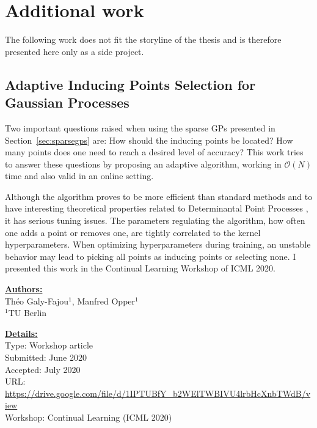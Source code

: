 \chapter{Additional work} 
\label{appendix:worshoppapers}
The following work does not fit the storyline of the thesis and is therefore presented here only as a side project.

\section{Adaptive Inducing Points Selection for Gaussian Processes}

Two important questions raised when using the sparse \acp{GP} presented in Section~\ref{sec:sparsegps} are:
How should the inducing points be located?
How many points does one need to reach a desired level of accuracy?
This work tries to answer these questions by proposing an adaptive algorithm, working in $\mathcal{O}(N)$ time and also valid in an online setting.

Although the algorithm proves to be more efficient than standard methods and to have interesting theoretical properties related to Determinantal Point Processes \cite{Kulesza2012}, it has serious tuning issues.
The parameters regulating the algorithm, how often one adds a point or removes one, are tightly correlated to the kernel hyperparameters.
When optimizing hyperparameters during training, an unstable behavior may lead to picking all points as inducing points or selecting none.
I presented this work in the Continual Learning Workshop of ICML 2020.

\textbf{\underline{Authors:}}\\
Th\'eo Galy-Fajou$^1$, Manfred Opper$^1$\\
\small{$^1$TU Berlin}

\textbf{\underline{Details:}}\\
Type: Workshop article\\
Submitted: June 2020\\
Accepted: July 2020\\
URL: \url{https://drive.google.com/file/d/1IPTUBfY_b2WElTWBIVU4lrbHcXnbTWdB/view}\\
Workshop: Continual Learning (ICML 2020)\\





